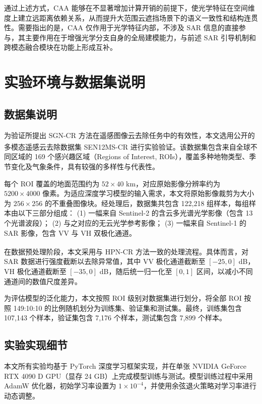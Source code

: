 通过上述方式，CAA 能够在不显著增加计算开销的前提下，使光学特征在空间维度上建立远距离依赖关系，从而提升大范围云遮挡场景下的语义一致性和结构连贯性。需要指出的是，CAA 仅作用于光学特征内部，不涉及 SAR 信息的直接参与，其主要作用在于增强光学分支自身的全局建模能力，与前述 SAR 引导机制和跨模态融合模块在功能上形成互补。

\section{实验环境与数据集说明}

\subsection{数据集说明}

为验证所提出 SGN-CR 方法在遥感图像云去除任务中的有效性，本文选用公开的多模态遥感云去除数据集 SEN12MS-CR\textsuperscript{\cite{ebel2022sen12ms}} 进行实验验证。该数据集包含来自全球不同区域的 169 个感兴趣区域（Regions of Interest, ROIs），覆盖多种地物类型、季节变化及气象条件，具有较强的多样性与代表性。

每个 ROI 覆盖的地面范围约为 $52 \times 40$ km，对应原始影像分辨率约为 $5200 \times 4000$ 像素。为适应深度学习模型的输入需求，本文将原始影像裁剪为大小为 $256 \times 256$ 的不重叠图像块。经处理后，数据集共包含 122,218 组样本，每组样本由以下三部分组成：  
(1) 一幅来自 Sentinel-2 的含云多光谱光学影像（包含 13 个光谱波段）；  
(2) 与之对应的无云光学参考影像；  
(3) 一幅来自 Sentinel-1 的 SAR 影像，包含 VV 与 VH 双极化通道。

在数据预处理阶段，本文采用与 HPN-CR 方法\textsuperscript{\cite{gu2025hpn}}一致的处理流程。具体而言，对 SAR 数据进行强度截断以去除异常值，其中 VV 极化通道截断至 $[-25, 0]$ dB，VH 极化通道截断至 $[-35, 0]$ dB，随后统一归一化至 $[0,1]$ 区间，以减小不同通道间的数值尺度差异。

为评估模型的泛化能力，本文按照 ROI 级别对数据集进行划分，将全部 ROI 按照 149:10:10 的比例随机划分为训练集、验证集和测试集。最终，训练集包含 107,143 个样本，验证集包含 7,176 个样本，测试集包含 7,899 个样本。

\subsection{实验实现细节}

本文所有实验均基于 PyTorch 深度学习框架实现，并在单张 NVIDIA GeForce RTX 4090 D GPU（显存 24 GB）上完成模型训练与测试。模型训练过程中采用 AdamW 优化器，初始学习率设置为 $1 \times 10^{-4}$，并使用余弦退火策略对学习率进行动态调整。

